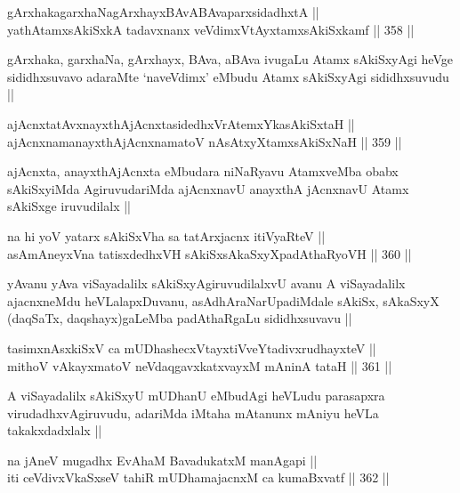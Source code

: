 \begin{shl}
gArxhakagarxhaNagArxhayxBAvABAvaparxsidadhxtA || \\
yathA\s \s tamxsAkiSxkA tadavxnanx veVdimxVtAyxtamxsAkiSxkamf ||  358 ||  
\end{shl}

\begin{artha}
gArxhaka, garxhaNa, gArxhayx, BAva, aBAva ivugaLu Atamx sAkiSxyAgi
heVge sididhxsuvavo adaraMte `naveVdimx' eMbudu Atamx sAkiSxyAgi
sididhxsuvudu ||
\end{artha}

\begin{shl}
ajAcnxtatAvxnayxthAjAcnxtasidedhxVrAtemxYkasAkiSxtaH || \\
ajAcnxnamanayxthAjAcnxnamatoV nAsAtxyXtamxsAkiSxNaH ||  359 ||  
\end{shl}

\begin{artha}
ajAcnxta, anayxthAjAcnxta eMbudara niNaRyavu AtamxveMba obabx
sAkiSxyiMda AgiruvudariMda ajAcnxnavU anayxthA jAcnxnavU Atamx
sAkiSxge iruvudilalx ||
\end{artha}

\begin{shl}
na hi yoV yatarx sAkiSxVha sa tatArxjacnx itiVyaRteV || \\
asAmAneyxVna tatisxdedhxVH sAkiSxsAkaSxyXpadAthaRyoVH ||  360 ||  
\end{shl}

\begin{artha}
yAvanu yAva viSayadalilx sAkiSxyAgiruvudilalxvU avanu A viSayadalilx
ajacnxneMdu heVLalapxDuvanu, asAdhAraNarUpadiMdale sAkiSx, sAkaSxyX
(daqSaTx, daqshayx)gaLeMba padAthaRgaLu sididhxsuvavu ||
\end{artha}


\begin{shl}
tasimxnAsxkiSxV ca mUDhashecxVtayxtiVveYtadivxrudhayxteV || \\
mithoV vAkayxmatoV neVdaqgavxkatxvayxM mAninA tataH ||  361 ||  
\end{shl}

\begin{artha}
A viSayadalilx sAkiSxyU mUDhanU eMbudAgi heVLudu parasapxra
virudadhxvAgiruvudu, adariMda iMtaha mAtanunx mAniyu heVLa
takakxdadxlalx ||
\end{artha}

\begin{shl}
na jAneV mugadhx EvAhaM BavadukatxM manAgapi || \\
iti ceVdivxVkaSxseV tahiR mUDhamajacnxM ca kumaBxvatf ||  362 ||  
\end{shl}

